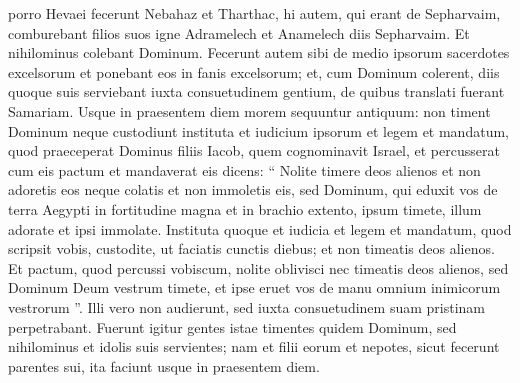 \begin{biblechapter}
\begin{biblechapter}
\begin{biblechapter}
\begin{biblechapter}
\begin{biblechapter}
\begin{biblechapter}
\begin{biblechapter}
\begin{biblechapter}
\begin{biblechapter}
\begin{biblechapter}
\begin{biblechapter}
\begin{biblechapter}
\begin{biblechapter}
\begin{biblechapter}
\begin{biblechapter}
\begin{biblechapter}
\begin{biblechapter}
\verse porro Hevaei fecerunt Nebahaz et Tharthac, hi autem, qui erant de Sepharvaim, comburebant filios suos igne Adramelech et Anamelech diis Sepharvaim. 
\verse Et nihilominus colebant Dominum. Fecerunt autem sibi de medio ipsorum sacerdotes excelsorum et ponebant eos in fanis excelsorum; 
\verse et, cum Dominum colerent, diis quoque suis serviebant iuxta consuetudinem gentium, de quibus translati fuerant Samariam.
 \verse Usque in praesentem diem morem sequuntur antiquum: non timent Dominum neque custodiunt instituta et iudicium ipsorum et legem et mandatum, quod praeceperat Dominus filiis Iacob, quem cognominavit Israel, 
\verse et percusserat cum eis pactum et mandaverat eis dicens: “ Nolite timere deos alienos et non adoretis eos neque colatis et non immoletis eis, 
\verse sed Dominum, qui eduxit vos de terra Aegypti in fortitudine magna et in brachio extento, ipsum timete, illum adorate et ipsi immolate. 
\verse Instituta quoque et iudicia et legem et mandatum, quod scripsit vobis, custodite, ut faciatis cunctis diebus; et non timeatis deos alienos. 
\verse Et pactum, quod percussi vobiscum, nolite oblivisci nec timeatis deos alienos, 
\verse sed Dominum Deum vestrum timete, et ipse eruet vos de manu omnium inimicorum vestrorum ”. 
\verse Illi vero non audierunt, sed iuxta consuetudinem suam pristinam perpetrabant.
 \verse Fuerunt igitur gentes istae timentes quidem Dominum, sed nihilominus et idolis suis servientes; nam et filii eorum et nepotes, sicut fecerunt parentes sui, ita faciunt usque in praesentem diem.
 

\end{biblechapter}
\end{biblechapter}
\end{biblechapter}
\end{biblechapter}
\end{biblechapter}
\end{biblechapter}
\end{biblechapter}
\end{biblechapter}
\end{biblechapter}
\end{biblechapter}
\end{biblechapter}
\end{biblechapter}
\end{biblechapter}
\end{biblechapter}
\end{biblechapter}
\end{biblechapter}
\end{biblechapter}

